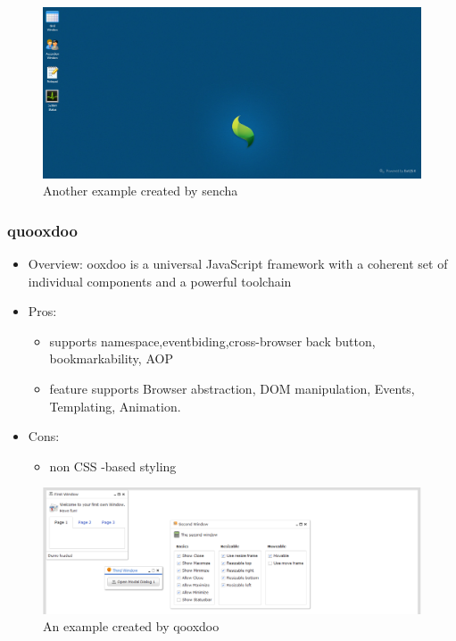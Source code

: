 \documentclass[14pt,a4paper]{extreport}
\begin{document}
			\begin{figure}
				\begin{center}
				\includegraphics[scale=0.5]{sencha1.png}
				\caption{Another example created by sencha}
				\end{center}
			\end{figure}					
			
			
		\subsubsection{quooxdoo}
			\begin{itemize}
				\item Overview: ooxdoo is a universal JavaScript framework with a coherent set of individual components and a powerful toolchain
				\item Pros: 
					\begin{itemize}
						\item supports namespace,eventbiding,cross-browser back button, bookmarkability, AOP
						\item feature supports Browser abstraction, DOM manipulation, Events, Templating, Animation.
					\end{itemize}
				\item Cons:
					\begin{itemize}
						\item non CSS -based styling
					
					\end{itemize}
			\end{itemize}
			\begin{figure}
				\begin{center}
				\includegraphics[scale=0.6]{qooxdoo.png}
				\caption{An example created by qooxdoo}
				\end{center}
			\end{figure}
\end{document}

